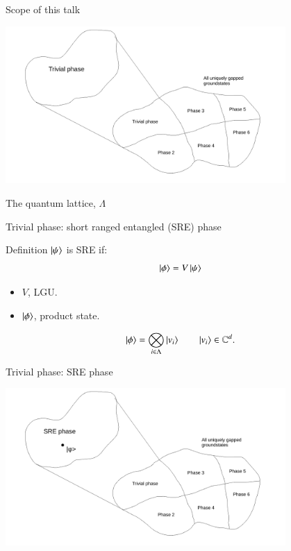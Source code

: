 \documentclass{beamer}
\begin{document}
\begin{frame}{Scope of this talk}
	\begin{center}
		\includegraphics[trim={1.5cm 0 2cm 0},clip,width=0.8\textwidth]{Figures/TrivialGappedPhaseOfQuantumMatter.pdf}
	\end{center}
\end{frame}

\begin{frame}{The quantum lattice, $\Lambda$}
	\begin{center}
		
	\end{center}
\end{frame}

\begin{frame}{Trivial phase: short ranged entangled (SRE) phase}
	\begin{block}{Definition}
		$\ket{\psi}$ is SRE if:
		\[\ket{\phi}=V\ket{\psi}\]
		\begin{itemize}
			\item $V$, LGU.
			\item $\ket{\phi}$, product state.
		\end{itemize}
		\[\ket{\phi}=\bigotimes_{i\in\Lambda}\ket{v_i}\qquad \ket{v_i}\in\mathbb{C}^d.\]
	\end{block}
\end{frame}

\begin{frame}{Trivial phase: SRE phase}
	\begin{center}
		\includegraphics[trim={1.5cm 0 2cm 0},clip,width=0.8\textwidth]{Figures/SRE_Phase.pdf}
	\end{center}
\end{frame}
\end{document}
